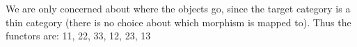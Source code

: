 We are only concerned about where the objects go, since the target category is a thin category (there is no choice about which morphism is mapped to). Thus the functors are: 11, 22, 33, 12, 23, 13

